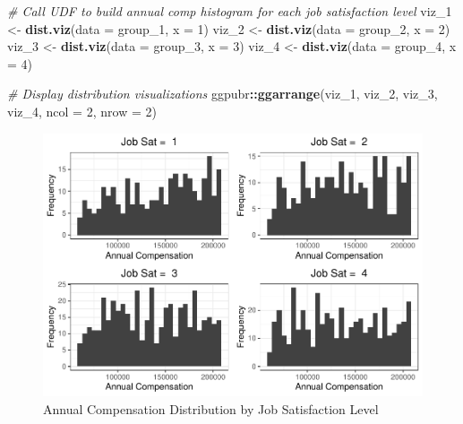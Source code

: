 \documentclass[]{book}
\newenvironment{Shaded}{\begin{snugshade}}{\end{snugshade}}
\newcommand{\CommentTok}[1]{\textcolor[rgb]{0.56,0.35,0.01}{\textit{#1}}}
\newcommand{\DataTypeTok}[1]{\textcolor[rgb]{0.13,0.29,0.53}{#1}}
\newcommand{\DecValTok}[1]{\textcolor[rgb]{0.00,0.00,0.81}{#1}}
\newcommand{\KeywordTok}[1]{\textcolor[rgb]{0.13,0.29,0.53}{\textbf{#1}}}
\newcommand{\NormalTok}[1]{#1}
\newcommand{\OperatorTok}[1]{\textcolor[rgb]{0.81,0.36,0.00}{\textbf{#1}}}
\newcommand{\StringTok}[1]{\textcolor[rgb]{0.31,0.60,0.02}{#1}}
\begin{document}
\begin{Shaded}
\begin{Highlighting}[]
\CommentTok{# Call UDF to build annual comp histogram for each job satisfaction level}
\NormalTok{viz_}\DecValTok{1}\NormalTok{ <-}\StringTok{ }\KeywordTok{dist.viz}\NormalTok{(}\DataTypeTok{data =}\NormalTok{ group_}\DecValTok{1}\NormalTok{, }\DataTypeTok{x =} \DecValTok{1}\NormalTok{)}
\NormalTok{viz_}\DecValTok{2}\NormalTok{ <-}\StringTok{ }\KeywordTok{dist.viz}\NormalTok{(}\DataTypeTok{data =}\NormalTok{ group_}\DecValTok{2}\NormalTok{, }\DataTypeTok{x =} \DecValTok{2}\NormalTok{)}
\NormalTok{viz_}\DecValTok{3}\NormalTok{ <-}\StringTok{ }\KeywordTok{dist.viz}\NormalTok{(}\DataTypeTok{data =}\NormalTok{ group_}\DecValTok{3}\NormalTok{, }\DataTypeTok{x =} \DecValTok{3}\NormalTok{)}
\NormalTok{viz_}\DecValTok{4}\NormalTok{ <-}\StringTok{ }\KeywordTok{dist.viz}\NormalTok{(}\DataTypeTok{data =}\NormalTok{ group_}\DecValTok{4}\NormalTok{, }\DataTypeTok{x =} \DecValTok{4}\NormalTok{)}

\CommentTok{# Display distribution visualizations}
\NormalTok{ggpubr}\OperatorTok{::}\KeywordTok{ggarrange}\NormalTok{(viz_}\DecValTok{1}\NormalTok{, viz_}\DecValTok{2}\NormalTok{, viz_}\DecValTok{3}\NormalTok{, viz_}\DecValTok{4}\NormalTok{,}
          \DataTypeTok{ncol =} \DecValTok{2}\NormalTok{, }\DataTypeTok{nrow =} \DecValTok{2}\NormalTok{)}
\end{Highlighting}
\end{Shaded}

\begin{figure}

{\centering \includegraphics{People_Analytics_Lifecycle_files/figure-latex/comp-dist-1} 

}

\caption{Annual Compensation Distribution by Job Satisfaction Level}\label{fig:comp-dist}
\end{figure}
\end{document}
